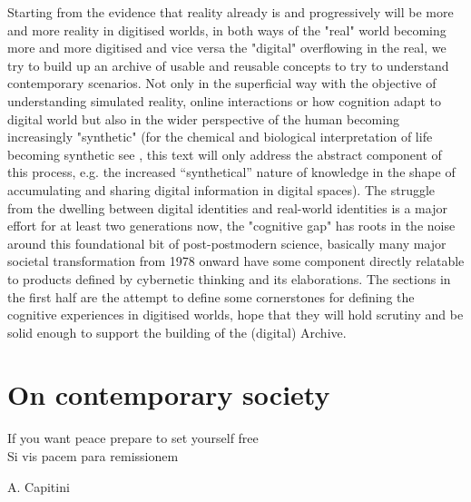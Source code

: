 \documentclass[14pt]{extarticle}
\begin{document}
\newline
\hspace*{15mm}Starting from the evidence that reality already is and progressively will be more and more reality in digitised worlds, in both ways of the "real" world becoming more and more digitised and vice versa the "digital" overflowing in the real, we try to build up an archive of usable and reusable concepts to try to understand contemporary scenarios. Not only in the superficial way with the objective of understanding simulated reality, online interactions or how cognition adapt to digital world but also in the wider perspective of the human becoming increasingly "synthetic" (for the chemical  and biological interpretation of life becoming synthetic see \cite{benanti2018realt}, this text will only address the abstract component of this process, e.g. the increased “synthetical” nature of knowledge in the shape of accumulating and sharing digital information in digital spaces).
\newline
\hspace*{15mm}The struggle from the dwelling between digital identities and real-world identities is a major effort for at least two generations now, the "cognitive gap" has roots in the noise around this foundational bit of post-postmodern science, basically many major societal transformation from 1978 onward have some component directly relatable to products defined by cybernetic thinking and its elaborations. The sections in the first half are the attempt to define some cornerstones for defining the cognitive experiences in digitised worlds, hope that they will hold scrutiny and be solid enough to support the building of the (digital) Archive.

\section*{On contemporary society}%
\label{sec:contemporary}%

\epigraph{
If you want peace prepare to set yourself free\\
\vspace{5mm}
Si vis pacem para remissionem}{A. Capitini}
\end{document}
